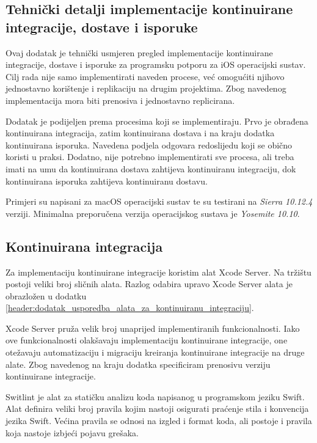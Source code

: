 \documentclass[times, utf8, diplomski, numeric]{fer}
\begin{document}
\begin{appendices}



\chapter{Tehnički detalji implementacije kontinuirane integracije, dostave i isporuke}

Ovaj dodatak je tehnički usmjeren pregled implementacije kontinuirane integracije, dostave i isporuke za programsku potporu za iOS operacijski sustav. Cilj rada nije samo implementirati naveden procese, već omogućiti njihovo jednostavno korištenje i replikaciju na drugim projektima. Zbog navedenog implementacija mora biti prenosiva i jednostavno replicirana.

Dodatak je podijeljen prema procesima koji se implementiraju. Prvo je obrađena kontinuirana integracija, zatim kontinuirana dostava i na kraju dodatka kontinuirana isporuka. Navedena podjela odgovara redoslijedu koji se obično koristi u praksi. Dodatno, nije potrebno implementirati sve procesa, ali treba imati na umu da kontinuirana dostava zahtijeva kontinuiranu integraciju, dok kontinuirana isporuka zahtijeva kontinuiranu dostavu.

Primjeri su napisani za macOS operacijski sustav te su testirani na \textit{Sierra 10.12.4} verziji. Minimalna preporučena verzija operacijskog sustava je \textit{Yosemite 10.10}.

\section{Kontinuirana integracija}

Za implementaciju kontinuirane integracije koristim alat Xcode Server. Na tržištu postoji veliki broj sličnih alata. Razlog odabira upravo Xcode Server alata je obrazložen u dodatku \ref{header:dodatak_usporedba_alata_za_kontinuiranu_integraciju}.

Xcode Server pruža velik broj unaprijed implementiranih funkcionalnosti. Iako ove funkcionalnosti olakšavaju implementaciju kontinuirane integracije, one otežavaju automatizaciju i migraciju kreiranja kontinuirane integracije na druge alate. Zbog navedenog na kraju dodatka specificiram prenosivu verziju kontinuirane integracije.



Switlint je alat za statičku analizu koda napisanog u programskom jeziku Swift. Alat definira veliki broj pravila kojim nastoji osigurati praćenje stila i konvencija jezika Swift. Većina pravila se odnosi na izgled i format koda, ali postoje i pravila koja nastoje izbjeći pojavu grešaka.


\end{appendices}
\end{document}
